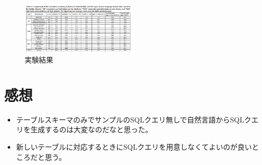 \documentclass[dvipdfmx,uplatex]{jsarticle}
\theoremstyle{remark}
\newenvironment{kansou}{
    \begin{tcolorbox}[
        colframe=brown,
        colback=brown!10!white,
        colbacktitle=brown!40!white,
        coltitle=black,fonttitle=\bfseries
    ]
}{
    \end{tcolorbox}
}
\begin{document}
\begin{figure}
    \centering
    \includegraphics[width=0.5\textwidth]{img/text2sql-with-slm-and-llm/experiment.png}
    \caption{実験結果}
    \label{fig:experiment}
\end{figure}

\section{感想}
\begin{kansou}
\begin{itemize}
  \item テーブルスキーマのみでサンプルのSQLクエリ無しで自然言語からSQLクエリを生成するのは大変なのだなと思った。
  \item 新しいテーブルに対応するときにSQLクエリを用意しなくてよいのが良いところだと思う。
\end{itemize}
\end{kansou}




\end{document}
